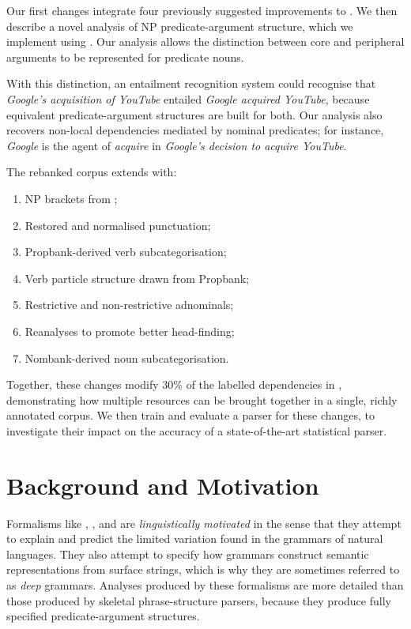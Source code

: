 \documentclass[11pt]{article}
\begin{document}
Our first changes integrate four previously suggested improvements
to \ccgbank. We then describe a novel \ccg analysis of NP predicate-argument
structure, which we implement using \nombank \citep{nombank}.
Our analysis allows the distinction between core and peripheral
arguments to be represented for predicate nouns.

With this distinction, an entailment recognition system could recognise that
\emph{Google's acquisition of YouTube} entailed \emph{Google acquired YouTube},
because equivalent predicate-argument structures are built for both.
Our analysis also recovers non-local dependencies mediated by nominal predicates;
for instance, \emph{Google} is the agent of \emph{acquire}
in \emph{Google's decision to acquire YouTube}.

The rebanked corpus extends \ccgbank with:
\vspace{-0.03in}
\begin{enumerate}
\addtolength{\itemsep}{-.99\itemsep}
 \item NP brackets from \citet{vadas:08};
 \item Restored and normalised punctuation;
 \item Propbank-derived verb subcategorisation;
 \item Verb particle structure drawn from Propbank;
 \item Restrictive and non-restrictive adnominals;
 \item Reanalyses to promote better head-finding;
 \item Nombank-derived noun subcategorisation.
\end{enumerate}
\vspace{-0.03in}
Together, these changes modify 30\% of the labelled dependencies in
\ccgbank, demonstrating how multiple resources can be brought
together in a single, richly annotated corpus. We then train and evaluate
a parser for these changes, to investigate their impact on the accuracy
of a state-of-the-art statistical \ccg parser.

\section{Background and Motivation}
\label{background}

Formalisms like \hpsg \citep{pollard:94}, \lfg \citep{kaplan:82}, and \ccg
\citep{steedman:00} are \emph{linguistically motivated} in the sense that they
attempt to explain and predict the limited variation found in the
grammars of natural languages. They also attempt to specify how grammars
construct semantic representations from surface strings, which is why they are
sometimes referred to as \emph{deep} grammars. Analyses produced by these
formalisms are more detailed than those produced by skeletal phrase-structure
parsers, because they produce fully specified predicate-argument structures.
\end{document}

